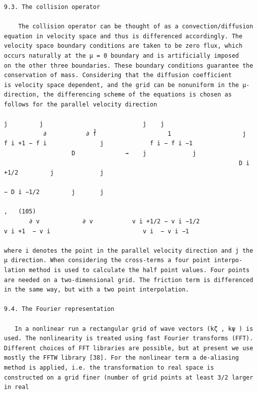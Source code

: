 \documentclass[a4paper]{article}
\newcommand{\gkwpagefont}{\fontsize{6.0pt}{7.55pt}\selectfont}
\begin{document}
\begin{Verbatim}[fontsize=\gkwpagefont]
9.3. The collision operator

    The collision operator can be thought of as a convection/diffusion equation in velocity space and thus is differenced accordingly. The
velocity space boundary conditions are taken to be zero flux, which occurs naturally at the μ = 0 boundary and is artificially imposed
on the other three boundaries. These boundary conditions guarantee the conservation of mass. Considering that the diffusion coefficient
is velocity space dependent, and the grid can be nonuniform in the μ-direction, the differencing scheme of the equations is chosen as
follows for the parallel velocity direction
                                                                                   j         j                            j    j       
           ∂           ∂ f̂                    1                    j             f i +1 − f i               j             f i − f i −1
                   D              →    j             j
                                                                  D i +1/2         j             j
                                                                                                         − D i −1/2         j       j
                                                                                                                                                  ,   (105)
       ∂ v            ∂ v           v i +1/2 − v i −1/2                      v i +1  − v i                          v i  − v i −1 

where i denotes the point in the parallel velocity direction and j the μ direction. When considering the cross-terms a four point interpo-
lation method is used to calculate the half point values. Four points are needed on a two-dimensional grid. The friction term is differenced
in the same way, but with a two point interpolation.

9.4. The Fourier representation

   In a nonlinear run a rectangular grid of wave vectors (kζ , kψ ) is used. The nonlinearity is treated using fast Fourier transforms (FFT).
Different choices of FFT libraries are possible, but at present we use mostly the FFTW library [38]. For the nonlinear term a de-aliasing
method is applied, i.e. the transformation to real space is constructed on a grid finer (number of grid points at least 3/2 larger in real
\end{Verbatim}
\newpage
\end{document}
